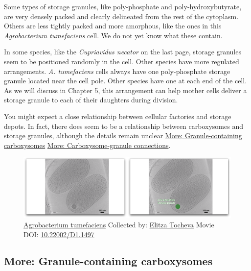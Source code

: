 \documentclass[]{tufte-book}
\begin{document}
Some types of storage granules, like poly-phosphate and
poly-hydroxybutyrate, are very densely packed and clearly delineated
from the rest of the cytoplasm. Others are less tightly packed and more
amorphous, like the ones in this \emph{Agrobacterium tumefaciens} cell.
We do not yet know what these contain.

In some species, like the \emph{Cupriavidus necator} on the last page,
storage granules seem to be positioned randomly in the cell. Other
species have more regulated arrangements. \emph{A. tumefaciens} cells
always have one poly-phosphate storage granule located near the cell
pole. Other species have one at each end of the cell. As we will discuss
in Chapter 5, this arrangement can help mother cells deliver a storage
granule to each of their daughters during division.

You might expect a close relationship between cellular factories and
storage depots. In fact, there does seem to be a relationship between
carboxysomes and storage granules, although the details remain unclear
\protect\hyperlink{Granule-containing_carboxysomes}{More:
Granule-containing carboxysomes}
\protect\hyperlink{Carboxysome-granule_connections}{More:
Carboxysome-granule connections}.





\begin{figure}
\includegraphics{movie_stills/4_9} \caption[\protect\hyperlink{tree}{Agrobacterium tumefaciens} Collected
by: \protect\hyperlink{elitza_tocheva}{Elitza Tocheva} Movie DOI:
\href{https://doi.org/10.22002/D1.1497}{10.22002/D1.1497}]{\protect\hyperlink{tree}{Agrobacterium tumefaciens} Collected
by: \protect\hyperlink{elitza_tocheva}{Elitza Tocheva} Movie DOI:
\href{https://doi.org/10.22002/D1.1497}{10.22002/D1.1497}}\label{fig:4-9}
\end{figure}

\hypertarget{Granule-containing_carboxysomes}{\subsection*{More:
Granule-containing carboxysomes}\label{Granule-containing_carboxysomes}}
\end{document}
